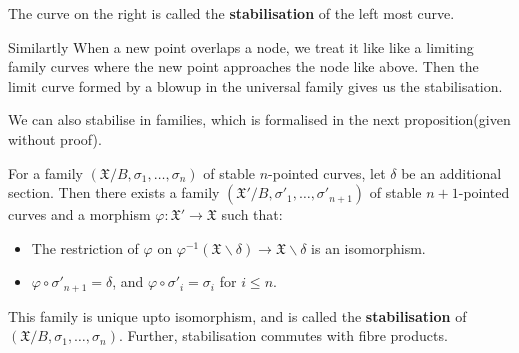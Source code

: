 The curve on the right is called the \textbf{stabilisation} of the left most curve.
\par Similartly When a new point overlaps a node, we treat it like like a limiting family curves where the new point approaches the node like above.
Then the limit curve formed by a blowup in the universal family gives us the stabilisation.
\par We can also stabilise in families, which is formalised in the next proposition(given without proof).
\begin{proposition}
    For a family $(\mathfrak{X}/B, \sigma_{1},\dots,\sigma_{n})$ of stable $n$-pointed curves, let $\delta$ be an additional section.
    Then there exists a family $(\mathfrak{X}'/B, \sigma'_{1},\dots,\sigma'_{n+1})$ of stable $n+1$-pointed curves and a morphism $\varphi: \mathfrak{X}'\to \mathfrak{X}$ such that:
    \begin{itemize}
        \item The restriction of $\varphi$ on $\varphi^{-1}(\mathfrak{X}\backslash \delta) \to \mathfrak{X}\backslash \delta$ is an isomorphism.
        \item $\varphi \circ \sigma'_{n+1} = \delta$, and $\varphi \circ \sigma'_{i} = \sigma_{i}$ for $i \leq n$.
    \end{itemize}
    This family is unique upto isomorphism, and is called the \textbf{stabilisation} of $(\mathfrak{X}/B, \sigma_{1},\allowbreak \dots,\allowbreak \sigma_{n})$. Further, stabilisation commutes with fibre products.
\end{proposition}

